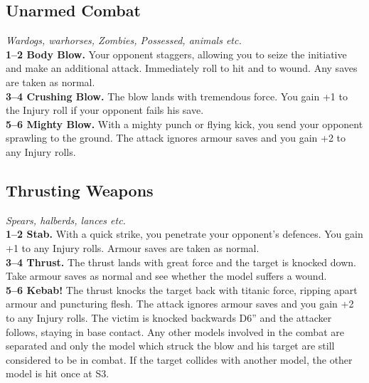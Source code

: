 \subsection*{Unarmed Combat}
\textit{Wardogs, warhorses, Zombies, Possessed, animals etc.}\\
\textbf{1–2 Body Blow.} Your opponent staggers, allowing you to seize the initiative and make an additional attack. Immediately roll to hit and to wound. Any saves are taken as normal.\\
\textbf{3–4 Crushing Blow.} The blow lands with tremendous force. You gain +1 to the Injury roll if your opponent fails his save.\\
\textbf{5–6 Mighty Blow.} With a mighty punch or flying kick, you send your opponent sprawling to the ground. The attack ignores armour saves and you gain +2 to any Injury rolls.

\subsection*{Thrusting Weapons}
\textit{Spears, halberds, lances etc.}\\
\textbf{1–2 Stab.} With a quick strike, you penetrate your opponent’s defences. You gain +1 to any Injury rolls. Armour saves are taken as normal.\\
\textbf{3–4 Thrust.} The thrust lands with great force and the target is knocked down. Take armour saves as normal and see whether the model suffers a wound.\\
\textbf{5–6 Kebab!} The thrust knocks the target back with titanic force, ripping apart armour and puncturing flesh. The attack ignores armour saves and you gain +2 to any Injury rolls. The victim is knocked backwards D6” and the attacker follows, staying in base contact. Any other models involved in the combat are separated and only the model which struck the blow and his target are still considered to be in combat. If the target collides with another model, the other model is hit once at S3.